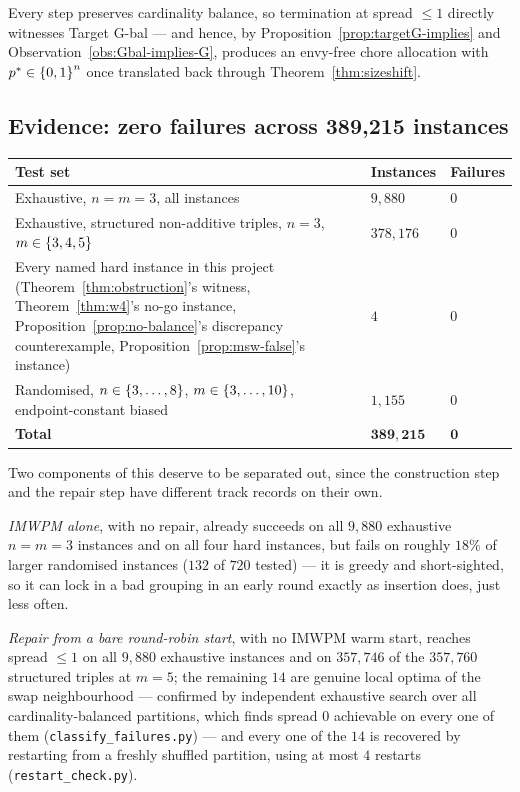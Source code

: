 Every step preserves cardinality balance, so termination at spread $\le 1$
directly witnesses Target G-bal --- and hence, by
Proposition~\ref{prop:targetG-implies} and
Observation~\ref{obs:Gbal-implies-G}, produces an envy-free chore allocation
with $p^{*} \in \left\{0,1\right\}^n$ once translated back through
Theorem~\ref{thm:sizeshift}.

\subsection{Evidence: zero failures across 389,215 instances}
\label{sec:construct-repair-evidence}

\begin{center}
\begin{tabular}{@{}p{}p{}p{}@{}}
\toprule
Test set & Instances & Failures \\
\midrule
Exhaustive, $n = m = 3$, all instances & $9{,}880$ & $0$ \\
Exhaustive, structured non-additive triples, $n=3$, $m \in \left\{3,4,5\right\}$ &
$378{,}176$ & $0$ \\
Every named hard instance in this project (Theorem~\ref{thm:obstruction}'s
witness, Theorem~\ref{thm:w4}'s no-go instance, Proposition~\ref{prop:no-balance}'s
discrepancy counterexample, Proposition~\ref{prop:msw-false}'s instance) & $4$
& $0$ \\
Randomised, $n \in \left\{3,\dots,8\right\}$, $m \in \left\{3,\dots,10\right\}$, endpoint-constant
biased & $1{,}155$ & $0$ \\
\midrule
\textbf{Total} & $\mathbf{389{,}215}$ & $\mathbf{0}$ \\
\bottomrule
\end{tabular}
\end{center}

Two components of this deserve to be separated out, since the construction
step and the repair step have different track records on their own.

\emph{IMWPM alone}, with no repair, already succeeds on all $9{,}880$
exhaustive $n=m=3$ instances and on all four hard instances, but fails on
roughly $18\%$ of larger randomised instances ($132$ of $720$ tested) ---
it is greedy and short-sighted, so it can lock in a bad grouping in an early
round exactly as insertion does, just less often.

\emph{Repair from a bare round-robin start}, with no IMWPM warm start, reaches
spread $\le 1$ on all $9{,}880$ exhaustive instances and on $357{,}746$ of the
$357{,}760$ structured triples at $m=5$; the remaining $14$ are genuine local
optima of the swap neighbourhood --- confirmed by independent exhaustive search
over all cardinality-balanced partitions, which finds spread $0$ achievable on
every one of them (\texttt{classify\_failures.py}) --- and every one of the $14$
is recovered by restarting from a freshly shuffled partition, using at most $4$
restarts (\texttt{restart\_check.py}).

